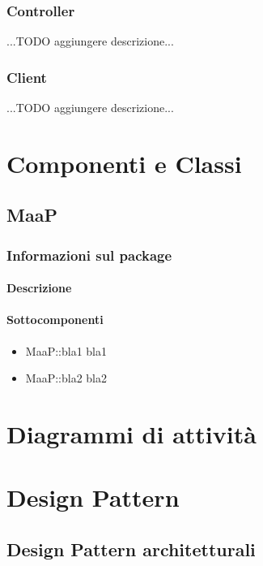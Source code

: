 \subsubsection{Controller}
...TODO aggiungere descrizione...

\subsubsection{Client}
...TODO aggiungere descrizione...

\newpage
\section{Componenti e Classi}

\subsection{MaaP}
\subsubsection{Informazioni sul package}
\paragraph{Descrizione}

\paragraph{Sottocomponenti}
\begin{itemize}
\item MaaP::bla1 bla1
\item MaaP::bla2 bla2
\end{itemize}

\newpage
\section{Diagrammi di attività}

\newpage
\section{Design Pattern}%
\subsection{Design Pattern architetturali} %
